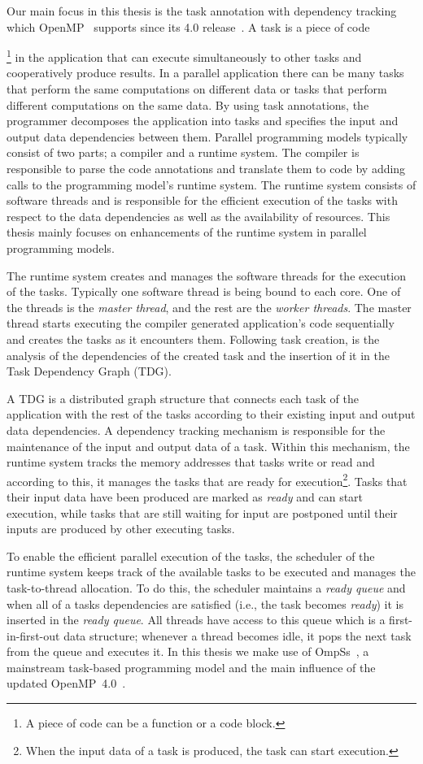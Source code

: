 Our main focus in this thesis is the task annotation with dependency tracking which OpenMP~\cite{OpenMP} supports since its 4.0 release~\cite{OpenMP4.0:Manual2015}.
A task is a piece of code{\footnote{A piece of code can be a function or a code block.} in the application that can execute simultaneously to other tasks and cooperatively produce results.
In a parallel application there can be many tasks that perform the same computations on different data or tasks that perform different computations on the same data.
By using task annotations, the programmer decomposes the application into tasks and specifies the input and output data dependencies between them.
Parallel programming models typically consist of two parts; a compiler and a runtime system.
The compiler is responsible to parse the code annotations and translate them to code by adding calls to the programming model's runtime system.
The runtime system consists of software threads and is responsible for the efficient execution of the tasks with respect to the data dependencies as well as the availability of resources.
This thesis mainly focuses on enhancements of the runtime system in parallel programming models.

The runtime system creates and manages the software threads for the execution of the tasks. 
Typically one software thread is being bound to each core. 
One of the threads is the \textit{master thread}, and the rest are the \textit{worker threads}. 
The master thread starts executing the compiler generated application's code sequentially and creates the tasks as it encounters them. 
Following task creation, is the analysis of the dependencies of the created task and the insertion of it in the Task Dependency Graph (TDG).

A TDG is a distributed graph structure that connects each task of the application with the rest of the tasks according to their existing input and output data dependencies.
A dependency tracking mechanism is responsible for the maintenance of the input and output data of a task.
Within this mechanism, the runtime system tracks the memory addresses that tasks write or read and according to this, it manages the tasks that are ready for execution\footnote{When the input data of a task is produced, the task can start execution.}.
Tasks that their input data have been produced are marked as \textit{ready} and can start execution, while tasks that are still waiting for input are postponed until their inputs are produced by other executing tasks.

To enable the efficient parallel execution of the tasks, the scheduler of the runtime system keeps track of the available tasks to be executed and manages the task-to-thread allocation.
To do this, the scheduler maintains a \textit{ready queue} and when all of a tasks dependencies are satisfied (i.e., the task becomes \textit{ready}) it is inserted in the \textit{ready queue}. 
All threads have access to this queue which is a first-in-first-out data structure; whenever a thread becomes idle, it pops the next task from the queue and executes it. 
In this thesis we make use of OmpSs~\cite{OmpSs}, a mainstream task-based programming model and the main influence of the updated OpenMP~4.0~\cite{OpenMP}.

}
